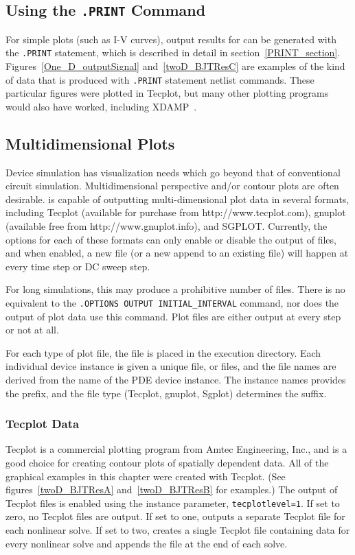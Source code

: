 \subsection{Using the \texttt{.PRINT} Command }
For simple plots (such as I-V curves), output results for \Xyce{}
can be generated with the \texttt{.PRINT} statement, which is described in
detail in section~\ref{PRINT_section}.
Figures~\ref{One_D_outputSignal} and~\ref{twoD_BJTResC} are examples of
the kind of data that is produced with \texttt{.PRINT} statement
netlist commands.  These particular figures were plotted in Tecplot, but
many other plotting programs would also have worked, including
XDAMP~\cite{xdamp}.

\subsection{Multidimensional Plots}
Device simulation has visualization needs which go beyond that of 
conventional circuit simulation.  Multidimensional perspective and/or
contour plots are often desirable.  \Xyce{} is capable of outputting
multi-dimensional plot data in several formats, including Tecplot (available 
for purchase from http://www.tecplot.com), 
gnuplot (available free from http://www.gnuplot.info), and SGPLOT.
Currently, the options for each of these formats can only enable
or disable the output of files, and when enabled, a new file (or a new
append to an existing file) will happen at every time step or DC sweep
step.

For long simulations, this may produce a prohibitive number of files.  There is
no equivalent to the \texttt{.OPTIONS OUTPUT INITIAL\_INTERVAL} command, nor
does the output of plot data use this command.   Plot files are either output
at every step or not at all.

For each type of plot file, the file is placed in the execution directory.
Each individual device instance is given a unique file, or files, and
the file names are derived from the name of the PDE device instance.  The
instance names provides the prefix, and the file type (Tecplot,
gnuplot, Sgplot) determines the suffix.

\subsubsection{Tecplot Data}
Tecplot is a commercial plotting program from Amtec Engineering, Inc.,
and is a good choice for creating contour plots of spatially dependent
data.  All of the graphical examples in this chapter were created with
Tecplot. (See figures~\ref{twoD_BJTResA} and~\ref{twoD_BJTResB} for examples.)
The output of Tecplot files is enabled using the instance parameter,
\texttt{tecplotlevel=1}.  If set to zero, no Tecplot files are output.
If set to one, \Xyce{} outputs a separate Tecplot file for each nonlinear solve.
If set to two, \Xyce{} creates a single Tecplot file containing data for every 
nonlinear solve and appends the file at the end of each solve.


